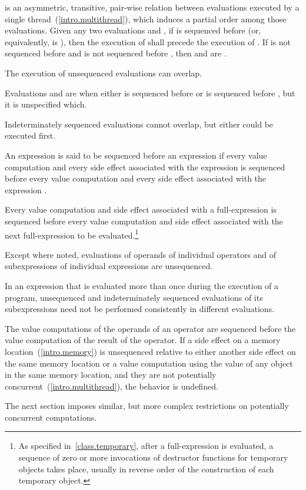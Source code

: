 \pnum
{} is an asymmetric, transitive, pair-wise relation between
evaluations executed by a single thread~(\ref{intro.multithread}), which induces
a partial order among those evaluations. Given any two evaluations  and
, if  is sequenced before 
(or, equivalently,  is  ),
then the execution of
 shall precede the execution of . If  is not sequenced
before  and  is not sequenced before , then  and
 are . \begin{note} The execution of unsequenced
evaluations can overlap. \end{note} Evaluations  and  are
 when either  is sequenced before
 or  is sequenced before , but it is unspecified which.
\begin{note} Indeterminately sequenced evaluations cannot overlap, but either
could be executed first. \end{note}
An expression 
is said to be sequenced before
an expression  if
every value computation and every side effect
associated with the expression 
is sequenced before
every value computation and every side effect
associated with the expression .

\pnum
Every
%
value computation and
%
side effect associated with a full-expression is
sequenced before every value computation and side effect associated with the
next full-expression to be evaluated.\footnote{As specified
in~\ref{class.temporary}, after a full-expression is evaluated, a sequence of
zero or more invocations of destructor functions for temporary objects takes
place, usually in reverse order of the construction of each temporary object.}

\pnum
{}%
Except where noted, evaluations of operands of individual operators and
of subexpressions of individual expressions are unsequenced. \begin{note}
In an expression that is evaluated more than once during the execution
of a program, unsequenced and indeterminately sequenced evaluations of
its subexpressions need not be performed consistently in different
evaluations. \end{note} The value computations of the operands of an
operator are sequenced before the value computation of the result of the
operator. If a
%
side effect on a memory location~(\ref{intro.memory}) is unsequenced
relative to either another side effect on the same memory location or
a value computation using the value of any object in the same memory location,
and they are not potentially concurrent~(\ref{intro.multithread}),
the behavior is undefined.
\begin{note}
The next section imposes similar, but more complex restrictions on
potentially concurrent computations.
\end{note}

